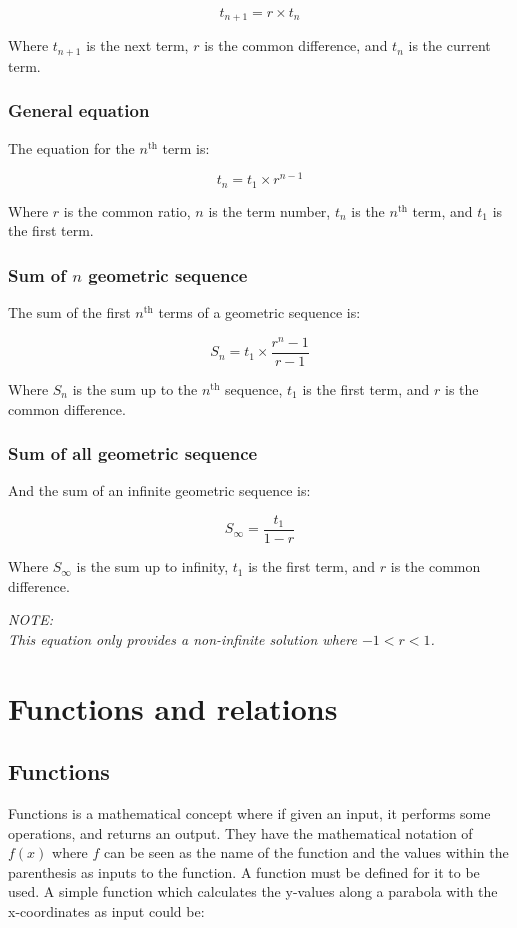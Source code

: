 \documentclass{book}
\newenvironment{generalInformation}{}{}
\newenvironment{note}{\begin{center}\em NOTE:\\}{\end{center}}
\begin{document}
\[
	t_{n + 1} = r \times t_n
\]

Where $t_{n + 1}$ is the next term, $r$ is the common difference, and $t_n$ is the current term.


\subsection{General equation}
The equation for the $n^{\text{th}}$ term is:

\[
	t_n = t_1 \times r^{n - 1}
\]

Where $r$ is the common ratio, $n$ is the term number, $t_n$ is the $n^{\text{th}}$ term, and $t_1$ is the first term.


\subsection{Sum of $n$ geometric sequence}
The sum of the first $n^{\text{th}}$ terms of a geometric sequence is:

\[
	S_n = t_1 \times \frac{r^n - 1}{r - 1}
\]

Where $S_n$ is the sum up to the $n^{\text{th}}$ sequence, $t_1$ is the first term, and $r$ is the common difference.


\subsection{Sum of all geometric sequence}
And the sum of an infinite geometric sequence is:

\[
	S_{\infty} = \frac{t_1}{1 - r}
\]

Where $S_{\infty}$ is the sum up to infinity, $t_1$ is the first term, and $r$ is the common difference.

\begin{note}
	This equation only provides a non-infinite solution where $-1 < r < 1$.
\end{note}




\chapter{Functions and relations}
\section{Functions}
\begin{generalInformation}
	Functions is a mathematical concept where if given an input, it performs some operations, and returns an output.  They have the mathematical notation of $f(x)$ where $f$ can be seen as the name of the function and the values within the parenthesis as inputs to the function.  A function must be defined for it to be used.  A simple function which calculates the y-values along a parabola with the x-coordinates as input could be:
\end{generalInformation}
\end{document}
